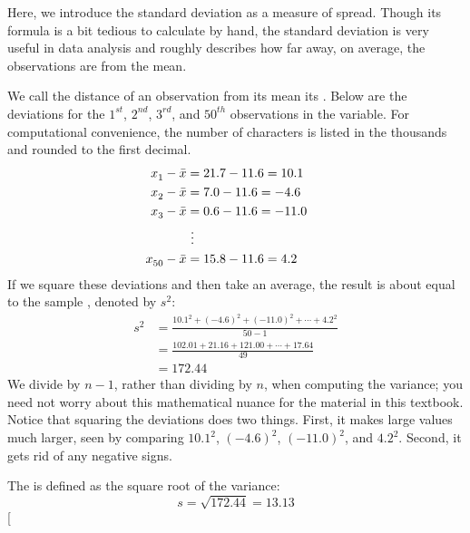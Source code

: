 Here, we introduce the standard deviation as a measure of spread. Though its formula is a bit tedious to calculate by hand, the standard deviation is very useful in data analysis and roughly describes how far away, on average, the observations are from the mean.

We call the distance of an observation from its mean its . Below are the deviations for the $1^{st}_{}$, $2^{nd}_{}$, $3^{rd}$, and $50^{th}_{}$ observations in the  variable. For computational convenience, the number of characters is listed in the thousands and rounded to the first decimal.
\begin{align*}
x_1^{}-\bar{x} &= 21.7 - 11.6 = 10.1 \hspace{5mm}\text{ } \\
x_2^{}-\bar{x} &= 7.0 - 11.6 = -4.6 \\
x_3^{}-\bar{x} &= 0.6 - 11.6 = -11.0 \\
			&\ \vdots \\
x_{50}^{}-\bar{x} &= 15.8 - 11.6 = 4.2
\end{align*}
If we square these deviations and then take an average, the result is about equal to the sample \label{varianceIsDefined}, denoted by $s_{}^2$:
\begin{align*}
s_{}^2 &= \frac{10.1_{}^2 + (-4.6)_{}^2 + (-11.0)_{}^2 + \cdots + 4.2_{}^2}{50-1} \\
	&= \frac{102.01 + 21.16 + 121.00 + \cdots + 17.64}{49} \\
	&= 172.44
\end{align*}
We divide by $n-1$, rather than dividing by $n$, when computing the variance; you need not worry about this mathematical nuance for the material in this textbook. Notice that squaring the deviations does two things. First, it makes large values much larger, seen by comparing $10.1^2$, $(-4.6)^2$, $(-11.0)^2$, and $4.2^2$. Second, it gets rid of any negative signs.

The  is defined as the square root of the variance:
$$s=\sqrt{172.44} = 13.13$$
\marginpar[\raggedright\vspace{-10mm}

